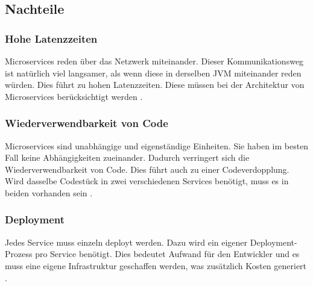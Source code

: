 \subsection{Nachteile}
\subsubsection{Hohe Latenzzeiten}
Microservices reden über das Netzwerk miteinander. Dieser Kommunikationsweg ist natürlich viel langsamer, als wenn diese in derselben JVM miteinander reden würden. Dies führt zu hohen Latenzzeiten. Diese müssen bei der Architektur von Microservices berücksichtigt werden \cite[Kapitel 1]{Newman2015}.

\subsubsection{Wiederverwendbarkeit von Code}
Microservices sind unabhängige und eigenständige Einheiten. Sie haben im besten Fall keine Abhängigkeiten zueinander. Dadurch verringert sich die Wiederverwendbarkeit von Code. Dies führt auch zu einer Codeverdopplung. Wird dasselbe Codestück in zwei verschiedenen Services benötigt, muss es in beiden vorhanden sein \cite[Kapitel 1]{Newman2015}.

\subsubsection{Deployment}
Jedes Service muss einzeln deployt werden. Dazu wird ein eigener Deployment-Prozess pro Service benötigt. Dies bedeutet Aufwand für den Entwickler und es muss eine eigene Infrastruktur geschaffen werden, was zusätzlich Kosten generiert \cite[Kapitel 1]{Newman2015}.
